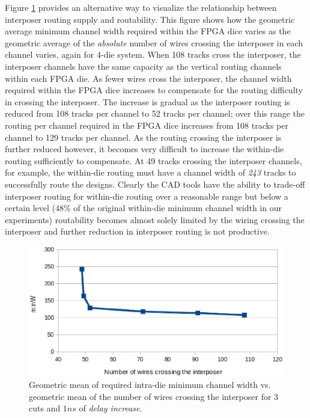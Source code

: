 \documentclass{sig-alternate-2013}
\begin{document}
Figure \ref{fig:crossingwires} provides an alternative way to visualize the relationship between interposer routing supply and routability. This figure shows how the geometric average minimum channel width required within the FPGA dice varies as the geometric average of the \emph{absolute} number of wires crossing the interposer in each channel varies, again for 4-die system. When 108 tracks cross the interposer, the interposer channels have the same capacity as the vertical routing channels within each FPGA die. As fewer wires cross the interposer, the channel width required within the FPGA dice increases to compensate for the routing difficulty in crossing the interposer. The increase is gradual as the interposer routing is reduced from 108 tracks per channel to 52 tracks per channel; over this range the routing per channel required in the FPGA dice increases from 108 tracks per channel to 129 tracks per channel. As the routing crossing the interposer is further reduced however, it becomes very difficult to increase the within-die routing sufficiently to compensate. At 49 tracks crossing the interposer channels, for example, the within-die routing must have a channel width of \emph{243} tracks to successfully route the designs. Clearly the CAD tools have the ability to trade-off interposer routing for within-die routing over a reasonable range but below a certain level (48\% of the original within-die minimum channel width in our experiments) routability becomes almost solely limited by the wiring crossing the interposer and further reduction in interposer routing is not productive.

\begin{figure}[!htbp]
\centering
\includegraphics[width=\linewidth]{numberofcrossingwires.eps}
\caption{Geometric mean of required intra-die minimum channel width vs. geometric mean of the number of wires crossing the interposer for 3 cuts and $1ns$ of \textit{delay increase}.}
\label{fig:crossingwires}
\end{figure}
\end{document}
